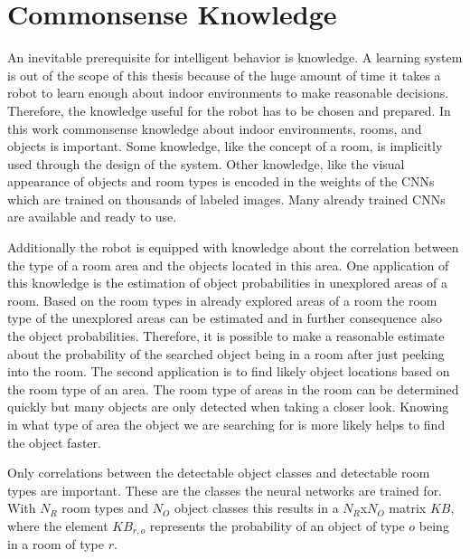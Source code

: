 \section{Commonsense Knowledge} \label{Knowledge}

An inevitable prerequisite for intelligent behavior is knowledge. A learning system is out of the scope of this thesis because of the huge amount of time it takes a robot to learn enough about indoor environments to make reasonable decisions. Therefore, the knowledge useful for the robot has to be chosen and prepared. In this work commonsense knowledge about indoor environments, rooms, and objects is important. Some knowledge, like the concept of a room, is implicitly used through the design of the system. Other knowledge, like the visual appearance of objects and room types is encoded in the weights of the CNNs which are trained on thousands of labeled images. Many already trained CNNs are available and ready to use. 

Additionally the robot is equipped with knowledge about the correlation between the type of a room area and the objects located in this area. One application of this knowledge is the estimation of object probabilities in unexplored areas of a room. Based on the room types in already explored areas of a room the room type of the unexplored areas can be estimated and in further consequence also the object probabilities. Therefore, it is possible to make a reasonable estimate about the probability of the searched object being in a room after just peeking into the room. The second application is to find likely object locations based on the room type of an area. The room type of areas in the room can be determined quickly but many objects are only detected when taking a closer look. Knowing in what type of area the object we are searching for is more likely helps to find the object faster.

Only correlations between the detectable object classes and detectable room types are important. These are the classes the neural networks are trained for. With $N_R$ room types and $N_O$ object classes this results in a $N_R$x$N_O$ matrix $KB$, where the element $KB_{r,o}$ represents the probability of an object of type $o$ being in a room of type $r$.

